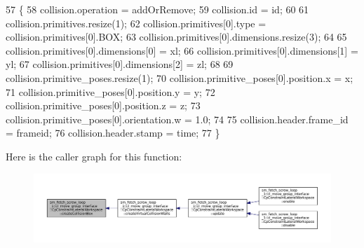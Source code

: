 \begin{DoxyCode}
57         \{
58             collision.operation = addOrRemove;
59             collision.id = id;
60 
61             collision.primitives.resize(1);
62             collision.primitives[0].type = collision.primitives[0].BOX;
63             collision.primitives[0].dimensions.resize(3);
64 
65             collision.primitives[0].dimensions[0] = xl;
66             collision.primitives[0].dimensions[1] = yl;
67             collision.primitives[0].dimensions[2] = zl;
68 
69             collision.primitive\_poses.resize(1);
70             collision.primitive\_poses[0].position.x = x;
71             collision.primitive\_poses[0].position.y = y;
72             collision.primitive\_poses[0].position.z = z;
73             collision.primitive\_poses[0].orientation.w = 1.0;
74 
75             collision.header.frame\_id = frameid;
76             collision.header.stamp = time;
77         \}
\end{DoxyCode}
Here is the caller graph for this function\+:
\nopagebreak
\begin{figure}[H]
\begin{center}
\leavevmode
\includegraphics[width=350pt]{classsm__fetch__screw__loop__1_1_1cl__move__group__interface_1_1CpConstraintLateralWorkspace_a0175f39854a8b063e202bbd418144d09_icgraph}
\end{center}
\end{figure}
\mbox{\label{classsm__fetch__screw__loop__1_1_1cl__move__group__interface_1_1CpConstraintLateralWorkspace_a090af6376b13560ccbbb7332ebb0b003}} 
